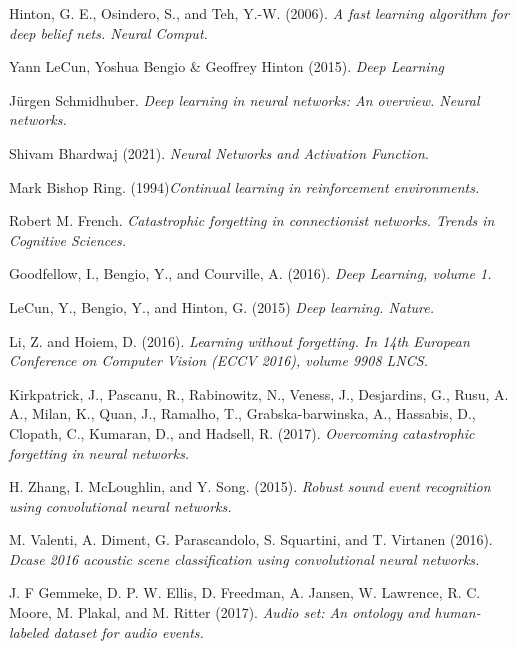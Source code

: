 \documentclass[english, LaM, oneside]{sapthesis}%
\begin{document}
\backmatter
{}
\begin{thebibliography}{17}

Hinton, G. E., Osindero, S., and Teh, Y.-W. (2006). \textit{A fast learning algorithm for deep belief nets. Neural Comput.}

Yann LeCun, Yoshua Bengio & Geoffrey Hinton (2015). \textit{Deep Learning}

Jürgen Schmidhuber.  \textit{Deep learning in neural networks: An overview. Neural networks.}

Shivam Bhardwaj (2021).  \textit{Neural Networks and Activation Function}.

Mark Bishop Ring. (1994)\textit{Continual learning in reinforcement environments.}

Robert M. French. \textit{Catastrophic forgetting in connectionist networks. Trends in Cognitive Sciences.}

Goodfellow, I., Bengio, Y., and Courville, A. (2016).  \textit{Deep Learning, volume 1.}

LeCun, Y., Bengio, Y., and Hinton, G. (2015)  \textit{Deep learning. Nature.} 



Li, Z. and Hoiem, D. (2016).  \textit{Learning without forgetting. In 14th European Conference on Computer Vision (ECCV 2016), volume 9908 LNCS.}

Kirkpatrick, J., Pascanu, R., Rabinowitz, N., Veness, J., Desjardins, G., Rusu, A. A., Milan, K., Quan, J., Ramalho, T., Grabska-barwinska, A., Hassabis, D., Clopath, C., Kumaran, D., and Hadsell, R. (2017). \textit{Overcoming catastrophic forgetting in neural networks.}

H. Zhang, I. McLoughlin, and Y. Song. (2015). \textit{Robust sound event recognition using convolutional neural networks.} 

 M. Valenti, A. Diment, G. Parascandolo, S. Squartini, and T. Virtanen (2016). \textit{Dcase 2016 acoustic scene classification using convolutional neural networks.} 

J. F Gemmeke, D. P. W. Ellis, D. Freedman, A. Jansen, W. Lawrence, R. C. Moore, M. Plakal, and M. Ritter (2017). \textit{Audio set: An ontology and human-labeled dataset for audio events.} 
 

\end{thebibliography}
\end{document}
